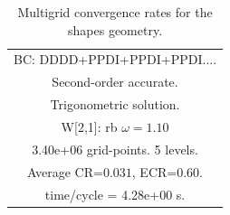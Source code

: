 \begin{table}[hbt]
\begin{center}
{\begin{tabular}{|c|c|c|c|c|}
\multicolumn{5}{|c|}{BC: DDDD+PPDI+PPDI+PPDI....}  \\
\multicolumn{5}{|c|}{Second-order accurate.}  \\
\multicolumn{5}{|c|}{Trigonometric solution.}  \\
\multicolumn{5}{|c|}{W[2,1]: rb $\omega=1.10$}  \\
\multicolumn{5}{|c|}{3.40e+06 grid-points. 5 levels.}  \\
\multicolumn{5}{|c|}{Average CR=$0.031$, ECR=$0.60$.}  \\
\multicolumn{5}{|c|}{time/cycle = 4.28e+00 s.}  \\
\hline 
\end{tabular}
} %
\end{center}
\caption{Multigrid convergence rates for the shapes geometry.}
 \label{tab:shapesI} 
\end{table}



